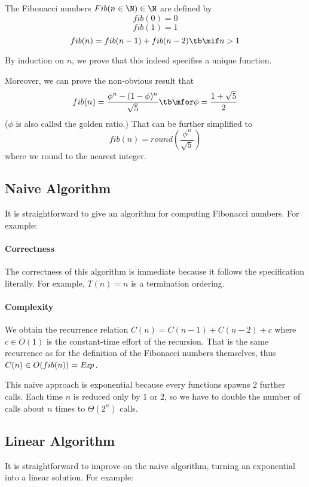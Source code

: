 The Fibonacci numbers $Fib(n\in\N)\in\N$ are defined by
\[fib(0)=0\]
\[fib(1)=1\]
\[fib(n)=fib(n-1)+fib(n-2) \tb\mif n>1\]

By induction on $n$, we prove that this indeed specifies a unique function.

Moreover, we can prove the non-obvious result that
 \[fib(n)=\frac{\phi^n-(1-\phi)^n}{\sqrt{5}} \tb\mfor \phi=\frac{1+\sqrt{5}}{2}\]
($\phi$ is also called the golden ratio.)
That can be further simplified to
 \[fib(n)=round\left(\frac{\phi^n}{\sqrt{5}}\right)\]
where we round to the nearest integer.

\subsection{Naive Algorithm}\label{sec:ad:fib:naive}

It is straightforward to give an algorithm for computing Fibonacci numbers.
For example:
\begin{acode}
\end{acode}

\paragraph{Correctness}
The correctness of this algorithm is immediate because it follows the specification literally.
For example, $T(n)=n$ is a termination ordering.

\paragraph{Complexity}
We obtain the recurrence relation $C(n)=C(n-1)+C(n-2)+c$ where $c\in O(1)$ is the constant-time effort of the recursion.
That is the same recurrence as for the definition of the Fibonacci numbers themselves, thus $C(n)\in O(fib(n))=\mathit{Exp}$.

This naive approach is exponential because every functions spawns $2$ further calls.
Each time $n$ is reduced only by $1$ or $2$, so we have to double the number of calls about $n$ times to $\Theta(2^n)$ calls.

\subsection{Linear Algorithm}\label{sec:ad:fib:linear}

It is straightforward to improve on the naive algorithm, turning an exponential into a linear solution.
For example:
\begin{acode}
\end{acode}

